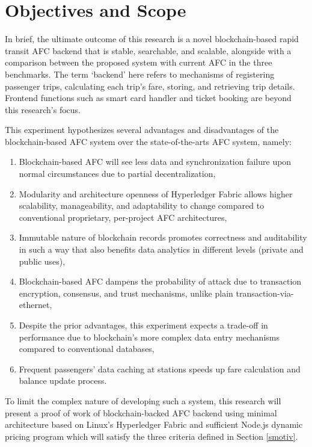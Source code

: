 \documentclass[a4paper,12pt,oneside, utf8x]{report}
\begin{document}


\section{Objectives and Scope}
In brief, the ultimate outcome of this research is a novel blockchain-based rapid transit AFC backend that is stable, searchable, and scalable, alongside with a comparison between the proposed system with current AFC in the three benchmarks. The term ‘backend’ here refers to mechanisms of registering passenger trips, calculating each trip’s fare, storing, and retrieving trip details. Frontend functions such as smart card handler and ticket booking are beyond this research’s focus.

This experiment hypothesizes several advantages and disadvantages of the blockchain-based AFC system over the state-of-the-arts AFC system, namely:
\begin{enumerate}
\item Blockchain-based AFC will see less data and synchronization failure upon normal circumstances due to partial decentralization,
\item Modularity and architecture openness of Hyperledger Fabric allows higher scalability, manageability, and adaptability to change compared to conventional proprietary, per-project AFC architectures,
\item Immutable nature of blockchain records promotes correctness and auditability in such a way that also benefits data analytics in different levels (private and public uses),
\item Blockchain-based AFC dampens the probability of attack due to transaction encryption, consensus, and trust mechanisms, unlike plain transaction-via-ethernet,
\item Despite the prior advantages, this experiment expects a trade-off in performance due to blockchain’s more complex data entry mechanisms compared to conventional databases,
\item Frequent passengers' data caching at stations speeds up fare calculation and balance update process.
\end{enumerate}

To limit the complex nature of developing such a system, this research will present a proof of work of blockchain-backed AFC backend using minimal architecture based on Linux’s Hyperledger Fabric and sufficient Node.js dynamic pricing program which will satisfy the three criteria defined in Section \ref{smotiv}.
\end{document}
